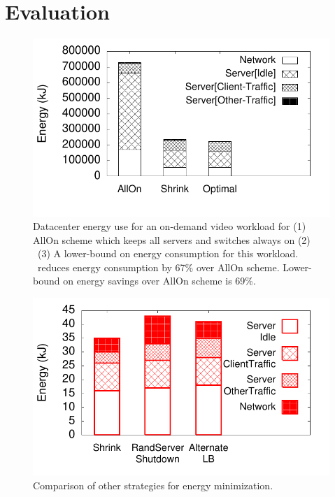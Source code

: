 
\section{Evaluation}


\begin{figure}[tbp]
\includegraphics[scale=0.55]{energy/graphs/real/g1_energy/energy.pdf}
\caption{Datacenter energy use for an on-demand video workload for (1) AllOn scheme which keeps all servers and switches always on (2) \shrink\ (3) A lower-bound on energy consumption for this workload. \shrink\ reduces energy consumption by 67\% over AllOn scheme. Lower-bound on energy savings over AllOn scheme is 69\%.}
\end{figure}

\begin{figure}[tbp]
\includegraphics[scale=0.55]{energy/graphs/dummy/g2_energy/energy.pdf}
\caption{Comparison of other strategies for energy minimization.}
\end{figure}


